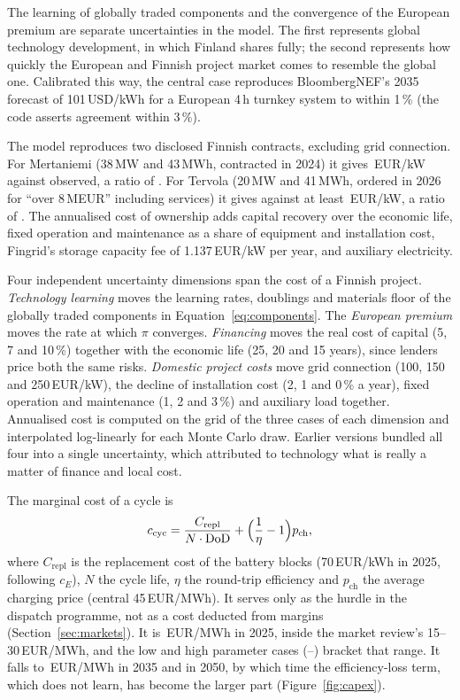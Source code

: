 \documentclass[11pt]{article}
\newcommand{\EUR}{EUR}
\begin{document}
The learning of globally traded components and the convergence of the European premium are separate uncertainties in the model.
The first represents global technology development, in which Finland shares fully; the second represents how quickly the European and Finnish project market comes to resemble the global one.
Calibrated this way, the central case reproduces BloombergNEF's 2035 forecast of 101\,USD/kWh for a European 4\,h turnkey system to within 1\,\% (the code asserts agreement within 3\,\%).

The model reproduces two disclosed Finnish contracts, excluding grid connection.
For Mertaniemi (38\,MW and 43\,MWh, contracted in 2024) it gives \,\EUR/kW against  observed, a ratio of . For Tervola (20\,MW and 41\,MWh, ordered in 2026 for ``over 8\,M\EUR{}'' including services) it gives  against at least \,\EUR/kW, a ratio of .
The annualised cost of ownership adds capital recovery over the economic life, fixed operation and maintenance as a share of equipment and installation cost, Fingrid's storage capacity fee of 1.137\,\EUR/kW per year, and auxiliary electricity.

Four independent uncertainty dimensions span the cost of a Finnish project.
\emph{Technology learning} moves the learning rates, doublings and materials floor of the globally traded components in Equation~\eqref{eq:components}.
The \emph{European premium} moves the rate at which $\pi$ converges.
\emph{Financing} moves the real cost of capital (5, 7 and 10\,\%) together with the economic life (25, 20 and 15 years), since lenders price both the same risks.
\emph{Domestic project costs} move grid connection (100, 150 and 250\,\EUR/kW), the decline of installation cost (2, 1 and 0\,\% a year), fixed operation and maintenance (1, 2 and 3\,\%) and auxiliary load together.
Annualised cost is computed on the grid of the three cases of each dimension and interpolated log-linearly for each Monte Carlo draw. Earlier versions bundled all four into a single uncertainty, which attributed to technology what is really a matter of finance and local cost.

The marginal cost of a cycle is
\begin{equation}\label{eq:cycle}
c_{\mathrm{cyc}} = \frac{C_{\mathrm{repl}}}{N\cdot \mathrm{DoD}} + \Bigl(\frac{1}{\eta}-1\Bigr)p_{\mathrm{ch}},
\end{equation}
where $C_{\mathrm{repl}}$ is the replacement cost of the battery blocks (70\,\EUR/kWh in 2025, following $c_E$), $N$ the cycle life, $\eta$ the round-trip efficiency and $p_{\mathrm{ch}}$ the average charging price (central 45\,\EUR/MWh).
It serves only as the hurdle in the dispatch programme, not as a cost deducted from margins (Section~\ref{sec:markets}). It is \,\EUR/MWh in 2025, inside the market review's 15--30\,\EUR/MWh, and the low and high parameter cases (--) bracket that range. It falls to \,\EUR/MWh in 2035 and  in 2050, by which time the efficiency-loss term, which does not learn, has become the larger part (Figure~\ref{fig:capex}).
\end{document}
